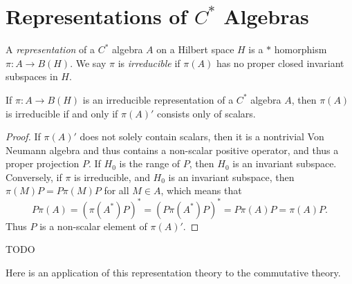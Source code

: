 \section{Representations of $C^*$ Algebras}

A \emph{representation} of a $C^*$ algebra $A$ on a Hilbert space $H$ is a $*$ homorphism $\pi: A \to B(H)$. We say $\pi$ is \emph{irreducible} if $\pi(A)$ has no proper closed invariant subspaces in $H$.

\begin{theorem}
    If $\pi: A \to B(H)$ is an irreducible representation of a $C^*$ algebra $A$, then $\pi(A)$ is irreducible if and only if $\pi(A)'$ consists only of scalars.
\end{theorem}
\begin{proof}
    If $\pi(A)'$ does not solely contain scalars, then it is a nontrivial Von Neumann algebra and thus contains a non-scalar positive operator, and thus a proper projection $P$. If $H_0$ is the range of $P$, then $H_0$ is an invariant subspace. Conversely, if $\pi$ is irreducible, and $H_0$ is an invariant subspace, then $\pi(M) P = P \pi(M) P$ for all $M \in A$, which means that
    \[ P \pi(A) = (\pi(A^*) P)^* = (P \pi(A^*) P)^* = P \pi(A) P = \pi(A) P. \]
    Thus $P$ is a non-scalar element of $\pi(A)'$.
\end{proof}

TODO

Here is an application of this representation theory to the commutative theory.


